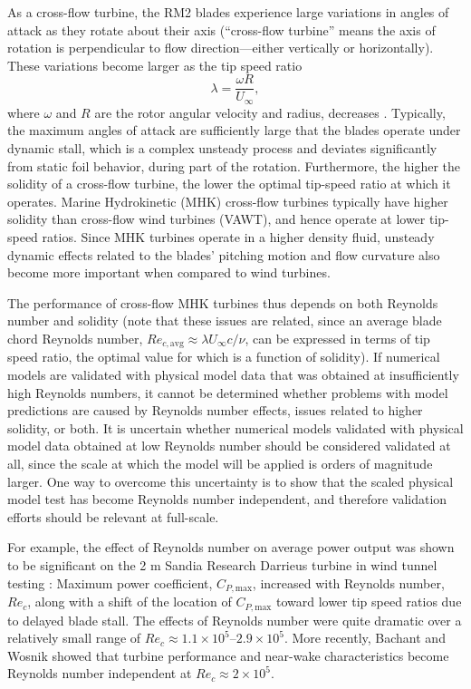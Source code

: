 \documentclass[10pt,letterpaper]{article}
\begin{document}
As a cross-flow turbine, the RM2 blades experience large variations in angles of
attack as they rotate about their axis (``cross-flow turbine'' means the axis of
rotation is perpendicular to flow direction---either vertically or
horizontally). These variations become larger as the tip speed ratio
\begin{equation}
\lambda=\frac{\omega R}{U_\infty},
\end{equation}
where $\omega$ and $R$ are the rotor angular velocity and radius, decreases
\cite{Para2002}. Typically, the maximum angles of attack are sufficiently large
that the blades operate under dynamic stall, which is a complex unsteady process
and deviates significantly from static foil behavior, during part of the
rotation. Furthermore, the higher the solidity of a cross-flow turbine, the
lower the optimal tip-speed ratio at which it operates. Marine Hydrokinetic
(MHK) cross-flow turbines typically have higher solidity than cross-flow wind
turbines (VAWT), and hence operate at lower tip-speed ratios. Since MHK turbines
operate in a higher density fluid, unsteady dynamic effects related to the
blades' pitching motion and flow curvature also become more important when
compared to wind turbines.

The performance of cross-flow MHK turbines thus depends on both Reynolds number
and solidity (note that these issues are related, since an average blade chord
Reynolds number, $Re_{c,\mathrm{avg}} \approx \lambda U_\infty c/ \nu$, can be
expressed in terms of tip speed ratio, the optimal value for which is a function
of solidity). If numerical models are validated with physical model data that
was obtained at insufficiently high Reynolds numbers, it cannot be determined
whether problems with model predictions are caused by Reynolds number effects,
issues related to higher solidity, or both. It is uncertain whether numerical
models validated with physical model data obtained at low Reynolds number should
be considered validated at all, since the scale at which the model will be
applied is orders of magnitude larger. One way to overcome this uncertainty is
to show that the scaled physical model test has become Reynolds number
independent, and therefore validation efforts should be relevant at full-scale.

For example, the effect of Reynolds number on average power output was shown to
be significant on the 2 m Sandia Research Darrieus turbine in wind tunnel
testing \cite{Blackwell1976}: Maximum power coefficient, $C_{P,\mathrm{max}}$,
increased with Reynolds number, $Re_c$, along with a shift of the location of
$C_{P,\mathrm{max}}$ toward lower tip speed ratios due to delayed blade stall.
The effects of Reynolds number were quite dramatic over a relatively small range
of $Re_c \approx 1.1 \times 10^5$--$2.9 \times 10^5$. More recently, Bachant and
Wosnik \cite{Bachant2014, Bachant2015-RVAT-Re-dep} showed that turbine
performance and near-wake characteristics become Reynolds number independent at
$Re_c \approx 2 \times 10^5$.
\end{document}

